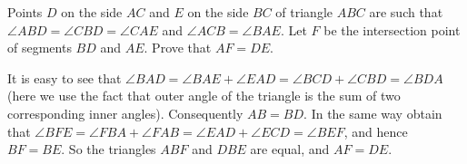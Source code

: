 \problem
Points $D$ on the side $AC$ and $E$ on the side $BC$ of triangle $ABC$ are such
that $\angle ABD = \angle CBD = \angle CAE$ and $\angle ACB = \angle BAE$.
Let $F$ be the intersection point of segments $BD$ and $AE$.
Prove that $AF = DE$.

\solution
It is easy to see that
\(
    \angle BAD = \angle BAE + \angle EAD
=
    \angle BCD + \angle CBD = \angle BDA
\)
(here we use the fact that outer angle of the triangle is the sum of two corresponding inner angles). Consequently $AB = BD$. In the same way obtain that
\(
    \angle BFE = \angle FBA + \angle FAB
=
    \angle EAD + \angle ECD = \angle BEF
\), and hence $BF=BE$. So the triangles $ABF$ and $DBE$ are equal, and $AF = DE$.
\endproblem
